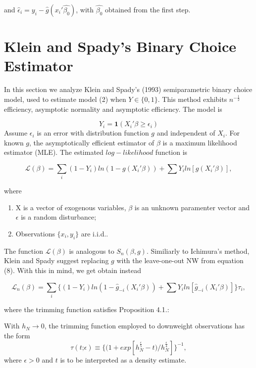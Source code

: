 \documentclass[a4paper]{article}
\begin{document}
and $\hat{\epsilon}_i = y_i - \hat{g}(x_i'\hat{\beta_0})$, with $\hat{\beta_0}$ obtained from the first step.


\section{Klein and Spady's Binary Choice Estimator} %
\label{sec:section_about_references_within_the_document}
In this section we analyze Klein and Spady's (1993) semiparametric binary choice model, used to estimate model (2) when $Y \in \{0,1\}$.   This method exhibits $n^{-\frac{1}{2}}$ efficiency, asymptotic normality and asymptotic efficiency. The model is

\begin{equation}
Y_i =  \mathbf{1}{(X_i'\beta \geq \epsilon_i)}
\end{equation}
Assume $\epsilon_i$ is an error with distribution function $g$ and independent of $X_i$. For known $g$, the asymptotically efficient estimator of $\beta$ is a maximum likelihood estimator (MLE). The estimated $log-likelihood$ function is

\begin{equation}
\mathcal{L}(\beta) = \sum_i (1 - Y_i)ln( 1 - g(X_i'\beta)) + \sum Y_iln[g(X_i'\beta)],
\end{equation}

where

\begin{enumerate}
		\item X is a vector of exogenous variables, $\beta$ is an unknown paramenter vector and $\epsilon$ is a random disturbance;
		\item Observations $\{x_i,y_i\}$ are i.i.d..
\end{enumerate}

The function $\mathcal{L}(\beta)$ is analogous to $S_n(\beta,g)$. Similiarly to Ichimura's method, Klein and Spady suggest replacing $g$ with the leave-one-out NW from equation (8). With this in mind, we get obtain instead

\begin{equation}
\mathcal{L}_n(\beta) = \sum_i \{ (1 - Y_i)ln( 1 - \hat{g}_{-i}(X_i'\beta)) + \sum Y_iln[\hat{g}_{-i}(X_i'\beta)]\}\tau_{i},
\end{equation}

where the trimming function satisfies Proposition 4.1.:

\newtheorem{proposition}{Proposition}[section]
\begin{prop}
With $h_N \rightarrow 0$, the trimming function employed to downweight observations has the form
\[ \tau(t \text{;}\epsilon) \equiv \{(1 + exp[h_{N}^{\frac{\epsilon}{5}} - t)/h_{N}^{\frac{\epsilon}{4}}]\}^{-1}, \]
where $\epsilon > 0$ and $t$ is to be interpreted as a density estimate.
\end{prop}
\end{document}
